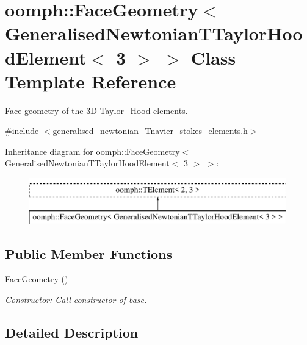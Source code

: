 \hypertarget{classoomph_1_1FaceGeometry_3_01GeneralisedNewtonianTTaylorHoodElement_3_013_01_4_01_4}{}\section{oomph\+:\+:Face\+Geometry$<$ Generalised\+Newtonian\+T\+Taylor\+Hood\+Element$<$ 3 $>$ $>$ Class Template Reference}
\label{classoomph_1_1FaceGeometry_3_01GeneralisedNewtonianTTaylorHoodElement_3_013_01_4_01_4}


Face geometry of the 3D Taylor\+\_\+\+Hood elements.  




{\ttfamily \#include $<$generalised\+\_\+newtonian\+\_\+\+Tnavier\+\_\+stokes\+\_\+elements.\+h$>$}

Inheritance diagram for oomph\+:\+:Face\+Geometry$<$ Generalised\+Newtonian\+T\+Taylor\+Hood\+Element$<$ 3 $>$ $>$\+:\begin{figure}[H]
\begin{center}
\leavevmode
\includegraphics[height=2.000000cm]{classoomph_1_1FaceGeometry_3_01GeneralisedNewtonianTTaylorHoodElement_3_013_01_4_01_4}
\end{center}
\end{figure}
\subsection*{Public Member Functions}
\begin{DoxyCompactItemize}
\item 
\hyperlink{classoomph_1_1FaceGeometry_3_01GeneralisedNewtonianTTaylorHoodElement_3_013_01_4_01_4_a3fd9f0d478b976a221b28e5a034d0dfd}{Face\+Geometry} ()
\begin{DoxyCompactList}\small\item\em Constructor\+: Call constructor of base. \end{DoxyCompactList}\end{DoxyCompactItemize}


\subsection{Detailed Description}
